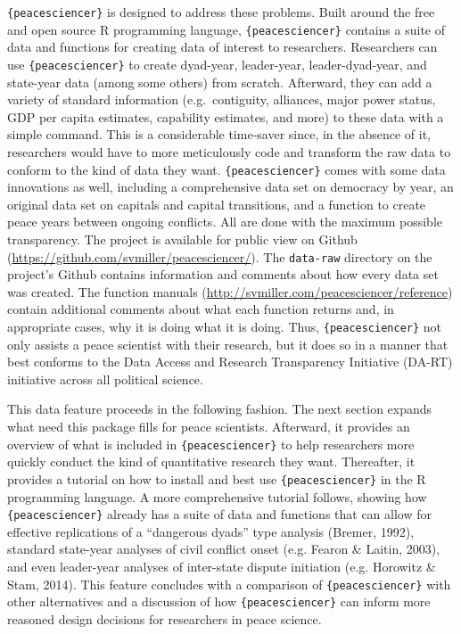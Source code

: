 \documentclass[
  11pt,
]{article}
\begin{document}
\texttt{\{peacesciencer\}} is designed to address these problems. Built around the free and open source R programming language, \texttt{\{peacesciencer\}} contains a suite of data and functions for creating data of interest to researchers. Researchers can use \texttt{\{peacesciencer\}} to create dyad-year, leader-year, leader-dyad-year, and state-year data (among some others) from scratch. Afterward, they can add a variety of standard information (e.g.~contiguity, alliances, major power status, GDP per capita estimates, capability estimates, and more) to these data with a simple command. This is a considerable time-saver since, in the absence of it, researchers would have to more meticulously code and transform the raw data to conform to the kind of data they want. \texttt{\{peacesciencer\}} comes with some data innovations as well, including a comprehensive data set on democracy by year, an original data set on capitals and capital transitions, and a function to create peace years between ongoing conflicts. All are done with the maximum possible transparency. The project is available for public view on Github (\url{https://github.com/svmiller/peacesciencer/}). The \texttt{data-raw} directory on the project's Github contains information and comments about how every data set was created. The function manuals (\url{http://svmiller.com/peacesciencer/reference}) contain additional comments about what each function returns and, in appropriate cases, why it is doing what it is doing. Thus, \texttt{\{peacesciencer\}} not only assists a peace scientist with their research, but it does so in a manner that best conforms to the Data Access and Research Transparency Initiative (DA-RT) initiative across all political science.

This data feature proceeds in the following fashion. The next section expands what need this package fills for peace scientists. Afterward, it provides an overview of what is included in \texttt{\{peacesciencer\}} to help researchers more quickly conduct the kind of quantitative research they want. Thereafter, it provides a tutorial on how to install and best use \texttt{\{peacesciencer\}} in the R programming language. A more comprehensive tutorial follows, showing how \texttt{\{peacesciencer\}} already has a suite of data and functions that can allow for effective replications of a ``dangerous dyads'' type analysis (Bremer, 1992), standard state-year analyses of civil conflict onset (e.g. Fearon \& Laitin, 2003), and even leader-year analyses of inter-state dispute initiation (e.g. Horowitz \& Stam, 2014). This feature concludes with a comparison of \texttt{\{peacesciencer\}} with other alternatives and a discussion of how \texttt{\{peacesciencer\}} can inform more reasoned design decisions for researchers in peace science.
\end{document}

